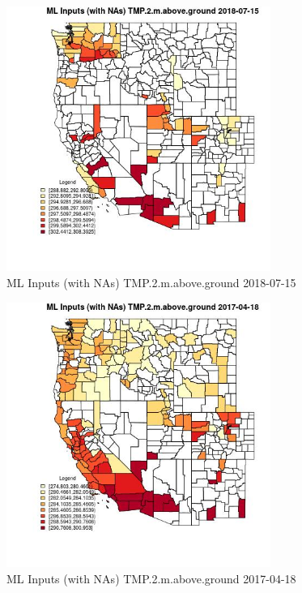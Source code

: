 \begin{figure} 
\centering  
\includegraphics[width=0.77\textwidth]{Code_Outputs/Report_ML_input_PM25_Step4_part_e_de_duplicated_aves_compiled_2019-05-21wNAs_CountyTMP2mabovegroundMean2018-07-15.jpg} 
\caption{\label{fig:Report_ML_input_PM25_Step4_part_e_de_duplicated_aves_compiled_2019-05-21wNAsCountyTMP2mabovegroundMean2018-07-15}ML Inputs (with NAs) TMP.2.m.above.ground 2018-07-15} 
\end{figure} 
 

\begin{figure} 
\centering  
\includegraphics[width=0.77\textwidth]{Code_Outputs/Report_ML_input_PM25_Step4_part_e_de_duplicated_aves_compiled_2019-05-21wNAs_CountyTMP2mabovegroundMean2017-04-18.jpg} 
\caption{\label{fig:Report_ML_input_PM25_Step4_part_e_de_duplicated_aves_compiled_2019-05-21wNAsCountyTMP2mabovegroundMean2017-04-18}ML Inputs (with NAs) TMP.2.m.above.ground 2017-04-18} 
\end{figure} 
 

